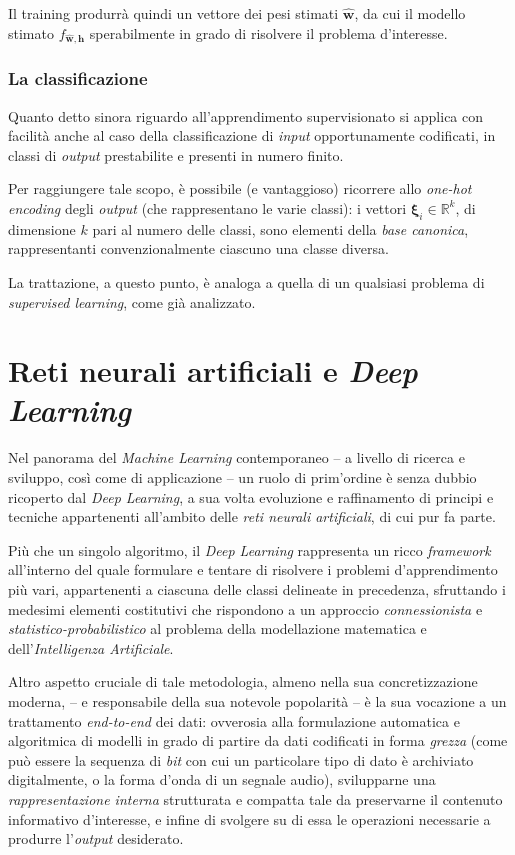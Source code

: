 \documentclass[a4paper, twoside]{article}
\begin{document}
Il training produrrà quindi un vettore dei pesi stimati $\hat{\boldsymbol{w}}$, da cui il modello stimato $f_{\hat{\boldsymbol{w}}, \boldsymbol{h}}$ sperabilmente in grado di risolvere il problema d'interesse.

\subsubsection{La classificazione}

Quanto detto sinora riguardo all'apprendimento supervisionato si applica con facilità anche al caso della classificazione di \textit{input} opportunamente codificati, in classi di \textit{output} prestabilite e presenti in numero finito.

Per raggiungere tale scopo, è possibile (e vantaggioso) ricorrere allo \textit{one-hot encoding} degli \textit{output} (che rappresentano le varie classi): i vettori $\boldsymbol{\xi}_i \in \mathbb{R}^k$, di dimensione $k$ pari al numero delle classi, sono elementi della \textit{base canonica}, rappresentanti convenzionalmente ciascuno una classe diversa.

La trattazione, a questo punto, è analoga a quella di un qualsiasi problema di \textit{supervised learning}, come già analizzato.


\newpage
\section{Reti neurali artificiali e \textit{Deep Learning}}

Nel panorama del \textit{Machine Learning} contemporaneo -- a livello di ricerca e sviluppo, così come di applicazione -- un ruolo di prim'ordine è senza dubbio ricoperto dal \textit{Deep Learning}, a sua volta evoluzione e raffinamento di principi e tecniche appartenenti all'ambito delle \textit{reti neurali artificiali}, di cui pur fa parte.

Più che un singolo algoritmo, il \textit{Deep Learning} rappresenta un ricco \textit{framework} all'interno del quale formulare e tentare di risolvere i problemi d'apprendimento più vari, appartenenti a ciascuna delle classi delineate in precedenza, sfruttando i medesimi elementi costitutivi che rispondono a un approccio \textit{connessionista} e \textit{statistico-probabilistico} al problema della modellazione matematica e dell'\textit{Intelligenza Artificiale}.

Altro aspetto cruciale di tale metodologia, almeno nella sua concretizzazione moderna, -- e responsabile della sua notevole popolarità -- è la sua vocazione a un trattamento \textit{end-to-end} dei dati: ovverosia alla formulazione automatica e algoritmica di modelli in grado di partire da dati codificati in forma \textit{grezza} (come può essere la sequenza di \textit{bit} con cui un particolare tipo di dato è archiviato digitalmente, o la forma d'onda di un segnale audio), svilupparne una \textit{rappresentazione interna} strutturata e compatta tale da preservarne il contenuto informativo d'interesse, e infine di svolgere su di essa le operazioni necessarie a produrre l'\textit{output} desiderato.
\end{document}
